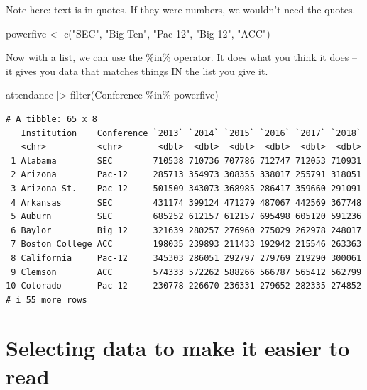 \documentclass[
  letterpaper,
  DIV=11,
  numbers=noendperiod]{scrreprt}
\newenvironment{Shaded}{\begin{snugshade}}{\end{snugshade}}
\newcommand{\FunctionTok}[1]{\textcolor[rgb]{0.28,0.35,0.67}{#1}}
\newcommand{\NormalTok}[1]{\textcolor[rgb]{0.00,0.23,0.31}{#1}}
\newcommand{\OtherTok}[1]{\textcolor[rgb]{0.00,0.23,0.31}{#1}}
\newcommand{\SpecialCharTok}[1]{\textcolor[rgb]{0.37,0.37,0.37}{#1}}
\newcommand{\StringTok}[1]{\textcolor[rgb]{0.13,0.47,0.30}{#1}}
\begin{document}
Note here: text is in quotes. If they were numbers, we wouldn't need the
quotes.

\begin{Shaded}
\begin{Highlighting}[]
\NormalTok{powerfive }\OtherTok{\textless{}{-}} \FunctionTok{c}\NormalTok{(}\StringTok{"SEC"}\NormalTok{, }\StringTok{"Big Ten"}\NormalTok{, }\StringTok{"Pac{-}12"}\NormalTok{, }\StringTok{"Big 12"}\NormalTok{, }\StringTok{"ACC"}\NormalTok{)}
\end{Highlighting}
\end{Shaded}

Now with a list, we can use the \%in\% operator. It does what you think
it does -- it gives you data that matches things IN the list you give
it.

\begin{Shaded}
\begin{Highlighting}[]
\NormalTok{attendance }\SpecialCharTok{|\textgreater{}} \FunctionTok{filter}\NormalTok{(Conference }\SpecialCharTok{\%in\%}\NormalTok{ powerfive)}
\end{Highlighting}
\end{Shaded}

\begin{verbatim}
# A tibble: 65 x 8
   Institution    Conference `2013` `2014` `2015` `2016` `2017` `2018`
   <chr>          <chr>       <dbl>  <dbl>  <dbl>  <dbl>  <dbl>  <dbl>
 1 Alabama        SEC        710538 710736 707786 712747 712053 710931
 2 Arizona        Pac-12     285713 354973 308355 338017 255791 318051
 3 Arizona St.    Pac-12     501509 343073 368985 286417 359660 291091
 4 Arkansas       SEC        431174 399124 471279 487067 442569 367748
 5 Auburn         SEC        685252 612157 612157 695498 605120 591236
 6 Baylor         Big 12     321639 280257 276960 275029 262978 248017
 7 Boston College ACC        198035 239893 211433 192942 215546 263363
 8 California     Pac-12     345303 286051 292797 279769 219290 300061
 9 Clemson        ACC        574333 572262 588266 566787 565412 562799
10 Colorado       Pac-12     230778 226670 236331 279652 282335 274852
# i 55 more rows
\end{verbatim}

\hypertarget{selecting-data-to-make-it-easier-to-read}{%
\section{Selecting data to make it easier to
read}\label{selecting-data-to-make-it-easier-to-read}}
\end{document}
